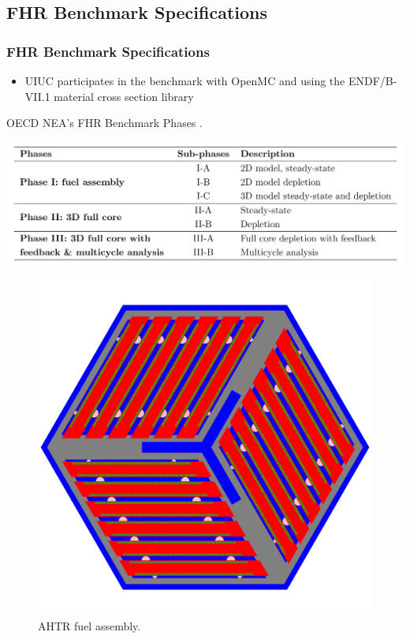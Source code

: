 \subsection{FHR Benchmark Specifications}
\begin{frame}
    \frametitle{FHR Benchmark Specifications}
    \begin{itemize}
        \item UIUC participates in the benchmark with OpenMC and using the ENDF/B-VII.1 material 
        cross section library
    \end{itemize}
    \vspace{-0.2cm}
    \begin{table}
        \caption{OECD NEA's FHR Benchmark Phases 
        \cite{petrovic_benchmark_2021}.}
        \vspace{-0.25cm}
        \includegraphics[width=0.7\linewidth]{figures/benchmark-phases.png} 
    \end{table}
    \vspace{-0.3cm}
    \begin{figure}[]
        \includegraphics[width=0.27\linewidth]{../docs/figures/ahtr-fuel-element.png} 
        \vspace{-0.2cm}
        \caption{AHTR fuel assembly.}
    \end{figure}
\end{frame}

